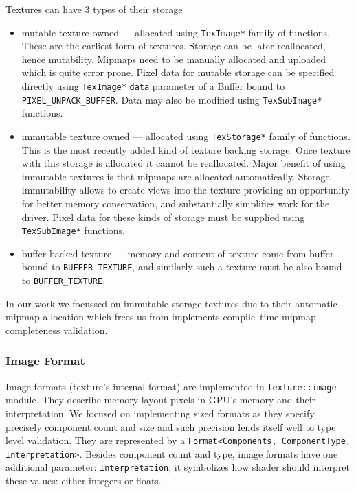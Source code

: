 Textures can have 3 types of their storage
\begin{itemize}
    \item mutable texture owned --- allocated using \texttt{TexImage*} family of functions. 
        These are the earliest form of textures. Storage can be later reallocated, hence mutability. 
        Mipmaps need to be manually allocated and uploaded which is quite error prone.
        Pixel data for mutable storage can be specified directly using 
        \texttt{TexImage*} \texttt{data} parameter of a Buffer bound to \texttt{PIXEL\_UNPACK\_BUFFER}.
        Data may also be modified using \texttt{TexSubImage*} functions.
    \item immutable texture owned --- allocated using \texttt{TexStorage*} family of functions. 
        This is the most recently added kind of texture backing storage. 
        Once texture with this storage is allocated it cannot be reallocated. 
        Major benefit of using immutable textures is that mipmaps are allocated automatically. 
        Storage immutability allows to create views into the texture providing 
        an opportunity for better memory conservation, and substantially simplifies work for the driver.
        Pixel data for these kinds of storage must be supplied using \texttt{TexSubImage*} functions.
    \item buffer backed texture --- memory and content of texture come from buffer bound to \texttt{BUFFER\_TEXTURE},
        and similarly such a texture must be also bound to \texttt{BUFFER\_TEXTURE}.
\end{itemize}

In our work we focussed on immutable storage textures due to their automatic mipmap allocation which frees us from 
implements compile--time mipmap completeness validation.

\subsubsection{Image Format}

Image formats (texture's internal format) are implemented in \texttt{texture::image} module.
They describe memory layout pixels in GPU's memory and their interpretation.
We focused on implementing sized formats as they specify precisely component count and size 
and such precision lends itself well to type level validation.
They are represented by a \texttt{Format<Components, ComponentType, Interpretation>}.
Besides component count and type, image formats have one additional parameter: \texttt{Interpretation},
it symbolizes how shader should interpret these values: either integers or floats.

